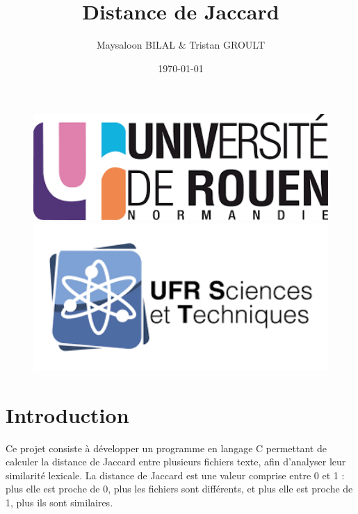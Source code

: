 \documentclass[a4paper, 12pt]{article}
\title{Distance de Jaccard}
\author{Maysaloon BILAL \& Tristan GROULT}
\date{\today}
\begin{document}
\begin{figure}[t]
    \centering
    \begin{minipage}{0.3\textwidth}
        \centering
        \includegraphics[width=1\textwidth]{logo_univ.png}
    \end{minipage}
    \hfill
    \begin{minipage}{0.3\textwidth}
        \centering
        \includegraphics[width=1\textwidth]{ufr_logo.png}
    \end{minipage}
\end{figure}

\maketitle

\clearpage\setcounter{page}{2}

{
\hypersetup{hidelinks} %
\renewcommand{\contentsname}{Sommaire}
\tableofcontents %
}

\clearpage

\section{Introduction}


Ce projet consiste à développer un programme en langage C permettant de calculer la distance de Jaccard entre plusieurs fichiers texte, afin d’analyser leur similarité lexicale. La distance de Jaccard est une valeur comprise entre 0 et 1 : plus elle est proche de 0, plus les fichiers sont différents, et plus elle est proche de 1, plus ils sont similaires.
\end{document}
